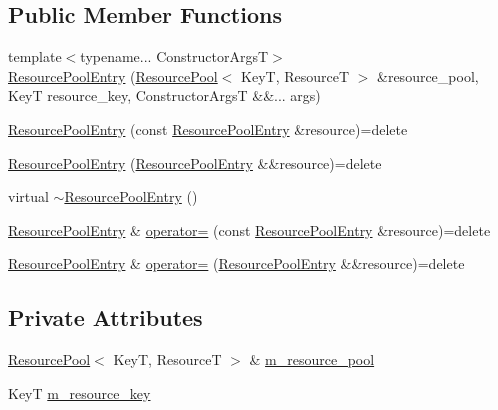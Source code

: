 \subsection*{Public Member Functions}
\begin{DoxyCompactItemize}
\item 
{\footnotesize template$<$typename... Constructor\+ArgsT$>$ }\\\hyperlink{structmage_1_1_resource_pool_1_1_resource_pool_entry_a8e255033a6f139f5f30e17869325eb2e}{Resource\+Pool\+Entry} (\hyperlink{classmage_1_1_resource_pool}{Resource\+Pool}$<$ KeyT, ResourceT $>$ \&resource\+\_\+pool, KeyT resource\+\_\+key, Constructor\+ArgsT \&\&... args)
\item 
\hyperlink{structmage_1_1_resource_pool_1_1_resource_pool_entry_a10ba1bc114b97a82fc957b17c3bef56e}{Resource\+Pool\+Entry} (const \hyperlink{structmage_1_1_resource_pool_1_1_resource_pool_entry}{Resource\+Pool\+Entry} \&resource)=delete
\item 
\hyperlink{structmage_1_1_resource_pool_1_1_resource_pool_entry_a7e97168b2d81c76dd6dbd6d7037a6243}{Resource\+Pool\+Entry} (\hyperlink{structmage_1_1_resource_pool_1_1_resource_pool_entry}{Resource\+Pool\+Entry} \&\&resource)=delete
\item 
virtual \hyperlink{structmage_1_1_resource_pool_1_1_resource_pool_entry_ae8d7b54f633fb865e2c299d2fd2bf466}{$\sim$\+Resource\+Pool\+Entry} ()
\item 
\hyperlink{structmage_1_1_resource_pool_1_1_resource_pool_entry}{Resource\+Pool\+Entry} \& \hyperlink{structmage_1_1_resource_pool_1_1_resource_pool_entry_a2a08bf48f2dce191a23f088530879ca0}{operator=} (const \hyperlink{structmage_1_1_resource_pool_1_1_resource_pool_entry}{Resource\+Pool\+Entry} \&resource)=delete
\item 
\hyperlink{structmage_1_1_resource_pool_1_1_resource_pool_entry}{Resource\+Pool\+Entry} \& \hyperlink{structmage_1_1_resource_pool_1_1_resource_pool_entry_ab9de5fdfecd8e19a510541b9353fe854}{operator=} (\hyperlink{structmage_1_1_resource_pool_1_1_resource_pool_entry}{Resource\+Pool\+Entry} \&\&resource)=delete
\end{DoxyCompactItemize}
\subsection*{Private Attributes}
\begin{DoxyCompactItemize}
\item 
\hyperlink{classmage_1_1_resource_pool}{Resource\+Pool}$<$ KeyT, ResourceT $>$ \& \hyperlink{structmage_1_1_resource_pool_1_1_resource_pool_entry_a657a97767707dbb045f49440dff4c126}{m\+\_\+resource\+\_\+pool}
\item 
KeyT \hyperlink{structmage_1_1_resource_pool_1_1_resource_pool_entry_a2ca0b2ee479f64dbec5288a9a8b2b4c9}{m\+\_\+resource\+\_\+key}
\end{DoxyCompactItemize}


